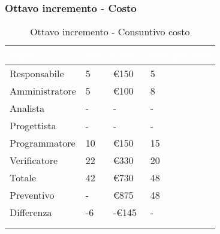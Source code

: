             \subsubsection{Ottavo incremento - Costo} {
                \setlength{\freewidth}{\dimexpr\textwidth-30\tabcolsep}
                \renewcommand{\arraystretch}{1.0}
                \centering
                \setlength{\aboverulesep}{0pt}
                \setlength{\belowrulesep}{0pt}
                \begin{longtable}{C{.4\freewidth} C{.2\freewidth} C{.2\freewidth} C{.2\freewidth}}
                \toprule
                \textcolor{white}{\textbf{Ruolo}}&
                \textcolor{white}{\textbf{Ore}}&
                \textcolor{white}{\textbf{Costo}} &
                \textcolor{white}{\textbf{Ore previste}}\\
                \toprule
                \endhead
          
                Responsabile & 5 & \euro150 & 5 \\
                Amministratore & 5 & \euro100 & 8 \\
                Analista & - & - & - \\
                Progettista & - & - & - \\
                Programmatore & 10 & \euro150 & 15 \\
                Verificatore & 22 & \euro330 & 20 \\
                Totale & 42 & \euro730 & 48  \\
                Preventivo & - & \euro875 & 48 \\
                Differenza & -6 & -\euro145 & - \\
                \bottomrule
                \\
                \caption{Ottavo incremento - Consuntivo costo}
          

\end{longtable}}
